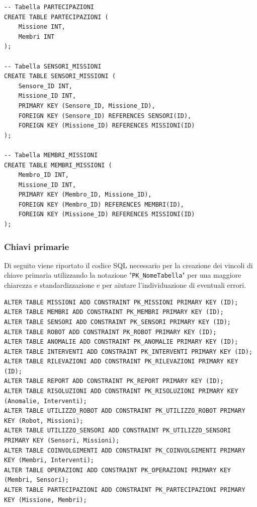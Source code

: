 \begin{lstlisting}
-- Tabella PARTECIPAZIONI
CREATE TABLE PARTECIPAZIONI (
    Missione INT,
    Membri INT
);

-- Tabella SENSORI_MISSIONI
CREATE TABLE SENSORI_MISSIONI (
    Sensore_ID INT,
    Missione_ID INT,
    PRIMARY KEY (Sensore_ID, Missione_ID),
    FOREIGN KEY (Sensore_ID) REFERENCES SENSORI(ID),
    FOREIGN KEY (Missione_ID) REFERENCES MISSIONI(ID)
);

-- Tabella MEMBRI_MISSIONI
CREATE TABLE MEMBRI_MISSIONI (
    Membro_ID INT,
    Missione_ID INT,
    PRIMARY KEY (Membro_ID, Missione_ID),
    FOREIGN KEY (Membro_ID) REFERENCES MEMBRI(ID),
    FOREIGN KEY (Missione_ID) REFERENCES MISSIONI(ID)
);
\end{lstlisting}

\subsubsection{Chiavi primarie}

Di seguito viene riportato il codice SQL necessario  per la creazione dei vincoli di chiave primaria utilizzando la notazione "\texttt{PK\_NomeTabella}" per una maggiore chiarezza e standardizzazione e per aiutare l'individuazione di eventuali errori.

\begin{lstlisting}
ALTER TABLE MISSIONI ADD CONSTRAINT PK_MISSIONI PRIMARY KEY (ID);
ALTER TABLE MEMBRI ADD CONSTRAINT PK_MEMBRI PRIMARY KEY (ID);
ALTER TABLE SENSORI ADD CONSTRAINT PK_SENSORI PRIMARY KEY (ID);
ALTER TABLE ROBOT ADD CONSTRAINT PK_ROBOT PRIMARY KEY (ID);
ALTER TABLE ANOMALIE ADD CONSTRAINT PK_ANOMALIE PRIMARY KEY (ID);
ALTER TABLE INTERVENTI ADD CONSTRAINT PK_INTERVENTI PRIMARY KEY (ID);
ALTER TABLE RILEVAZIONI ADD CONSTRAINT PK_RILEVAZIONI PRIMARY KEY (ID);
ALTER TABLE REPORT ADD CONSTRAINT PK_REPORT PRIMARY KEY (ID);
ALTER TABLE RISOLUZIONI ADD CONSTRAINT PK_RISOLUZIONI PRIMARY KEY (Anomalie, Interventi);
ALTER TABLE UTILIZZO_ROBOT ADD CONSTRAINT PK_UTILIZZO_ROBOT PRIMARY KEY (Robot, Missioni);
ALTER TABLE UTILIZZO_SENSORI ADD CONSTRAINT PK_UTILIZZO_SENSORI PRIMARY KEY (Sensori, Missioni);
ALTER TABLE COINVOLGIMENTI ADD CONSTRAINT PK_COINVOLGIMENTI PRIMARY KEY (Membri, Interventi);
ALTER TABLE OPERAZIONI ADD CONSTRAINT PK_OPERAZIONI PRIMARY KEY (Membri, Sensori);
ALTER TABLE PARTECIPAZIONI ADD CONSTRAINT PK_PARTECIPAZIONI PRIMARY KEY (Missione, Membri);
\end{lstlisting}

